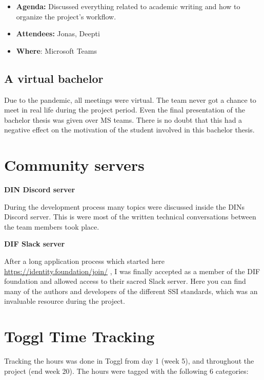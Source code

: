 \begin{itemize}
\tightlist
\item
  \textbf{Agenda:} Discussed everything related to academic writing and
  how to organize the project's workflow.
\item
  \textbf{Attendees:} Jonas, Deepti
\item
  \textbf{Where}: Microsoft Teams
\end{itemize}

\hypertarget{a-virtual-bachelor}{%
\subsection{A virtual bachelor}\label{a-virtual-bachelor}}

Due to the pandemic, all meetings were virtual. The team never got a
chance to meet in real life during the project period. Even the final
presentation of the bachelor thesis was given over MS teams. There is no
doubt that this had a negative effect on the motivation of the student
involved in this bachelor thesis.

\pagebreak

\hypertarget{community-servers}{%
\section{Community servers}\label{community-servers}}

\textbf{DIN Discord server}

During the development process many topics were discussed inside the
DINs Discord server. This is were most of the written technical
conversations between the team members took place.

\textbf{DIF Slack server}

After a long application process which started here
\url{https://identity.foundation/join/} , I was finally accepted as a
member of the DIF foundation and allowed access to their sacred Slack
server. Here you can find many of the authors and developers of the
different SSI standards, which was an invaluable resource during the
project.

\pagebreak

\hypertarget{toggl-time-tracking}{%
\section{Toggl Time Tracking}\label{toggl-time-tracking}}

Tracking the hours was done in Toggl from day 1 (week 5), and throughout
the project (end week 20). The hours were tagged with the following 6
categories:

